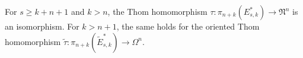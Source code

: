 For $s \geqslant k + n + 1$ and $k > n$, the Thom homomorphism $\tau: \pi_{n+k}(E^*_{s,k}) \to \mathfrak{N}^n$ is an isomorphism. For $k > n + 1$, the same holds for the oriented Thom homomorphism $\tilde{\tau}: \pi_{n+k}(\tilde{E}^*_{s,k}) \to \Omega^n$.
